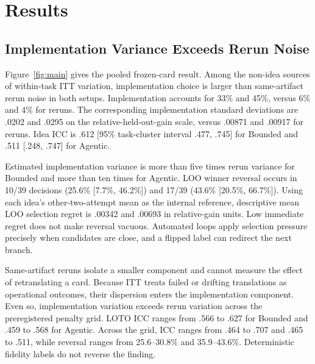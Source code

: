 \documentclass[letterpaper]{article}
\begin{document}
\section{Results}
\label{sec:results}

\subsection{Implementation Variance Exceeds Rerun Noise}

Figure~\ref{fig:main} gives the pooled frozen-card result. Among the non-idea sources of within-task ITT variation, implementation choice is larger than same-artifact rerun noise in both setups. Implementation accounts for 33\% and 45\%, versus 6\% and 4\% for reruns. The corresponding implementation standard deviations are .0202 and .0295 on the relative-held-out-gain scale, versus .00871 and .00917 for reruns. Idea ICC is .612 [95\% task-cluster interval .477, .745] for Bounded and .511 [.248, .747] for Agentic.

Estimated implementation variance is more than five times rerun variance for Bounded and more than ten times for Agentic. LOO winner reversal occurs in 10/39 decisions (25.6\% [7.7\%, 46.2\%]) and 17/39 (43.6\% [20.5\%, 66.7\%]). Using each idea's other-two-attempt mean as the internal reference, descriptive mean LOO selection regret is .00342 and .00693 in relative-gain units. Low immediate regret does not make reversal vacuous. Automated loops apply selection pressure precisely when candidates are close, and a flipped label can redirect the next branch.

Same-artifact reruns isolate a smaller component and cannot measure the effect of retranslating a card. Because ITT treats failed or drifting translations as operational outcomes, their dispersion enters the implementation component. Even so, implementation variation exceeds rerun variation across the preregistered penalty grid. LOTO ICC ranges from .566 to .627 for Bounded and .459 to .568 for Agentic. Across the grid, ICC ranges from .464 to .707 and .465 to .511, while reversal ranges from 25.6--30.8\% and 35.9--43.6\%. Deterministic fidelity labels do not reverse the finding.
\end{document}
